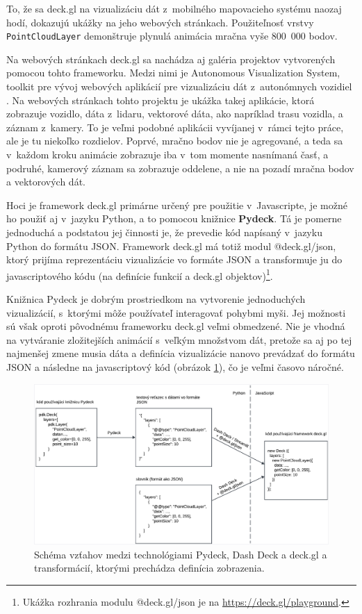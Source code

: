 To, že sa deck.gl na vizualizáciu dát z~mobilného mapovacieho systému naozaj hodí, dokazujú ukážky na jeho webových stránkach. Použiteľnosť vrstvy \texttt{PointCloudLayer} demonštruje plynulá animácia mračna vyše 800~000 bodov.

Na webových stránkach deck.gl sa nachádza aj galéria projektov vytvorených pomocou tohto frameworku. Medzi nimi je Autonomous Visualization System, toolkit pre vývoj webových aplikácií pre vizualizáciu dát z~autonómnych vozidiel \cite{avs}. Na webových stránkach tohto projektu je ukážka takej aplikácie, ktorá zobrazuje vozidlo, dáta z~lidaru, vektorové dáta, ako napríklad trasu vozidla, a záznam z~kamery. To je veľmi podobné aplikácii vyvíjanej v~rámci tejto práce, ale je tu niekoľko rozdielov. Poprvé, mračno bodov nie je agregované, a teda sa v~každom kroku animácie zobrazuje iba v~tom momente nasnímaná časť, a podruhé, kamerový záznam sa zobrazuje oddelene, a nie na pozadí mračna bodov a vektorových dát.

Hoci je framework deck.gl primárne určený pre použitie v~Javascripte, je možné ho použiť aj v~jazyku Python, a to pomocou knižnice \textbf{Pydeck}. Tá je pomerne jednoduchá a podstatou jej činnosti je, že prevedie kód napísaný v~jazyku Python do formátu JSON. Framework deck.gl má totiž modul @deck.gl/json, ktorý prijíma reprezentáciu vizualizácie vo formáte JSON a transformuje ju do javascriptového kódu (na definície funkcií a deck.gl objektov)\footnote{Ukážka rozhrania modulu @deck.gl/json je na \url{https://deck.gl/playground}.}.

Knižnica Pydeck je dobrým prostriedkom na vytvorenie jednoduchých vizualizácií, s~ktorými môže používateľ interagovať pohybmi myši. Jej možnosti sú však oproti pôvodnému frameworku deck.gl veľmi obmedzené. Nie je vhodná na vytváranie zložitejších animácií s~veľkým množstvom dát, pretože sa aj po tej najmenšej zmene musia dáta a definícia vizualizácie nanovo prevádzať do formátu JSON a následne na javascriptový kód (obrázok \ref{fig:pydeck_dashdeck_schema}), čo je veľmi časovo náročné.

\begin{figure}[h]
    \centering
    \includegraphics[width=1\linewidth]{text_prace/obrazky-figures/pydeck_dashdeck_transformacie.pdf}
    \caption{Schéma vzťahov medzi technológiami Pydeck, Dash Deck a deck.gl a transformácií, ktorými prechádza definícia zobrazenia.}
    \label{fig:pydeck_dashdeck_schema}
\end{figure}


